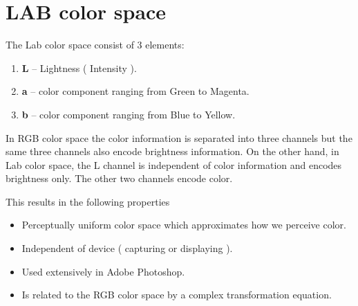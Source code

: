 \documentclass[12pt]{article}
\begin{document}
\section{LAB color space}
The Lab color space consist of 3 elements:
\begin{enumerate}
	\setlength\itemsep{0.37em}
	\item \textbf{L} – Lightness ( Intensity ).
	\item \textbf{a} – color component ranging from Green to Magenta.
	\item \textbf{b} – color component ranging from Blue to Yellow.
\end{enumerate}
\vspace{4pt}
In RGB color space the color information is separated into three channels but the same three channels also encode brightness information. On the other hand, in Lab color space, the L channel is independent of color information and encodes brightness only. The other two channels encode color. \cite{lab_article}\cite{lab_wiki}
\newline\newline

\noindent This results in the following properties
\begin{itemize}
	\setlength\itemsep{0.4em}
	\item Perceptually uniform color space which approximates how we perceive color.
	\item Independent of device ( capturing or displaying ).
	\item Used extensively in Adobe Photoshop.
	\item Is related to the RGB color space by a complex transformation equation.
\end{itemize}
\end{document}
